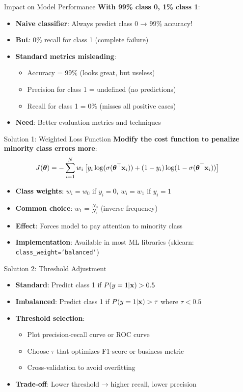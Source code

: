 \documentclass{beamer}
\begin{document}
\begin{frame}{Impact on Model Performance}
\textbf{With 99\% class 0, 1\% class 1}:
\begin{itemize}[<+->]
\item \textbf{Naive classifier}: Always predict class 0 → 99\% accuracy!
\item \textbf{But}: 0\% recall for class 1 (complete failure)
\item \textbf{Standard metrics misleading}:
    \begin{itemize}
    \item Accuracy = 99\% (looks great, but useless)
    \item Precision for class 1 = undefined (no predictions)
    \item Recall for class 1 = 0\% (misses all positive cases)
    \end{itemize}
\item \textbf{Need}: Better evaluation metrics and techniques
\end{itemize}
\end{frame}

\begin{frame}{Solution 1: Weighted Loss Function}
\textbf{Modify the cost function to penalize minority class errors more}:
$$J(\boldsymbol{\theta}) = -\sum_{i=1}^{N} w_i \left[y_i \log(\sigma(\boldsymbol{\theta}^\top\mathbf{x}_i)) + (1-y_i)\log(1-\sigma(\boldsymbol{\theta}^\top\mathbf{x}_i))\right]$$

\begin{itemize}[<+->]
\item \textbf{Class weights}: $w_i = w_0$ if $y_i = 0$, $w_i = w_1$ if $y_i = 1$
\item \textbf{Common choice}: $w_1 = \frac{N_0}{N_1}$ (inverse frequency)
\item \textbf{Effect}: Forces model to pay attention to minority class
\item \textbf{Implementation}: Available in most ML libraries (sklearn: \texttt{class\_weight='balanced'})
\end{itemize}
\end{frame}

\begin{frame}{Solution 2: Threshold Adjustment}
\begin{itemize}[<+->]
\item \textbf{Standard}: Predict class 1 if $P(y=1|\mathbf{x}) > 0.5$
\item \textbf{Imbalanced}: Predict class 1 if $P(y=1|\mathbf{x}) > \tau$ where $\tau < 0.5$
\item \textbf{Threshold selection}:
    \begin{itemize}
    \item Plot precision-recall curve or ROC curve
    \item Choose $\tau$ that optimizes F1-score or business metric
    \item Cross-validation to avoid overfitting
    \end{itemize}
\item \textbf{Trade-off}: Lower threshold → higher recall, lower precision
\end{itemize}
\end{frame}
\end{document}
